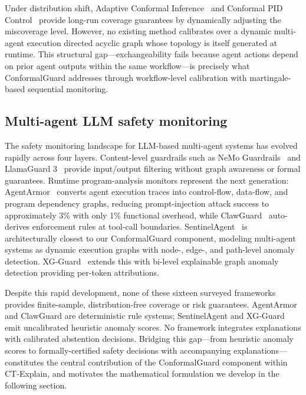 \documentclass[preprint,review,12pt]{elsarticle}
\begin{document}
Under distribution shift, Adaptive Conformal Inference~\cite{gibbs_aci_2024} and Conformal PID Control~\cite{angelopoulos_pid_2024} provide long-run coverage guarantees by dynamically adjusting the miscoverage level. However, no existing method calibrates over a dynamic multi-agent execution directed acyclic graph whose topology is itself generated at runtime. This structural gap---exchangeability fails because agent actions depend on prior agent outputs within the same workflow---is precisely what ConformalGuard addresses through workflow-level calibration with martingale-based sequential monitoring.

\subsection{Multi-agent LLM safety monitoring}

The safety monitoring landscape for LLM-based multi-agent systems has evolved rapidly across four layers. Content-level guardrails such as NeMo Guardrails~\cite{nemo_guardrails_2023} and LlamaGuard 3~\cite{llamaguard3_2024} provide input/output filtering without graph awareness or formal guarantees. Runtime program-analysis monitors represent the next generation: AgentArmor~\cite{agentarmor_2025} converts agent execution traces into control-flow, data-flow, and program dependency graphs, reducing prompt-injection attack success to approximately 3\% with only 1\% functional overhead, while ClawGuard~\cite{clawguard_2025} auto-derives enforcement rules at tool-call boundaries. SentinelAgent~\cite{sentinelagent_2025} is architecturally closest to our ConformalGuard component, modeling multi-agent systems as dynamic execution graphs with node-, edge-, and path-level anomaly detection. XG-Guard~\cite{xgguard_2025} extends this with bi-level explainable graph anomaly detection providing per-token attributions.

Despite this rapid development, none of these sixteen surveyed frameworks provides finite-sample, distribution-free coverage or risk guarantees. AgentArmor and ClawGuard are deterministic rule systems; SentinelAgent and XG-Guard emit uncalibrated heuristic anomaly scores. No framework integrates explanations with calibrated abstention decisions. Bridging this gap---from heuristic anomaly scores to formally-certified safety decisions with accompanying explanations---constitutes the central contribution of the ConformalGuard component within CT-Explain, and motivates the mathematical formulation we develop in the following section.
\end{document}

